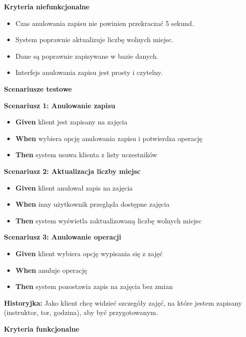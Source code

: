\documentclass[a4paper,12pt]{article}
\begin{document}
\noindent \textbf{Kryteria niefunkcjonalne}
\begin{itemize}
    \item Czas anulowania zapisu nie powinien przekraczać 5 sekund.
    \item System poprawnie aktualizuje liczbę wolnych miejsc.
    \item Dane są poprawnie zapisywane w bazie danych.
    \item Interfejs anulowania zapisu jest prosty i czytelny.
\end{itemize}

\noindent \textbf{Scenariusze testowe}

\textbf{Scenariusz 1: Anulowanie zapisu}
\begin{itemize}
    \item \textbf{Given} klient jest zapisany na zajęcia
    \item \textbf{When} wybiera opcję anulowania zapisu i potwierdza operację
    \item \textbf{Then} system usuwa klienta z listy uczestników
\end{itemize}

\textbf{Scenariusz 2: Aktualizacja liczby miejsc}
\begin{itemize}
    \item \textbf{Given} klient anulował zapis na zajęcia
    \item \textbf{When} inny użytkownik przegląda dostępne zajęcia
    \item \textbf{Then} system wyświetla zaktualizowaną liczbę wolnych miejsc
\end{itemize}

\textbf{Scenariusz 3: Anulowanie operacji}
\begin{itemize}
    \item \textbf{Given} klient wybiera opcję wypisania się z zajęć
    \item \textbf{When} anuluje operację
    \item \textbf{Then} system pozostawia zapis na zajęcia bez zmian
\end{itemize}

\vspace{0,5cm}

\noindent \textbf{Historyjka:} Jako klient chcę widzieć szczegóły zajęć, na które jestem zapisany (instruktor, tor, godzina), aby być przygotowanym.

\vspace{0,2cm}

\noindent \textbf{Kryteria funkcjonalne}
\end{document}
